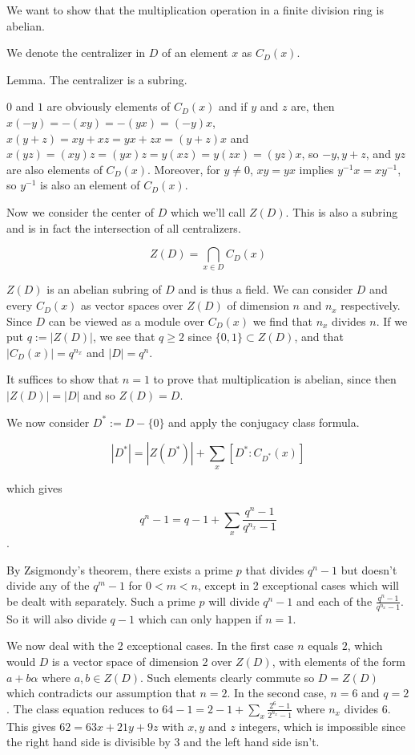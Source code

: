 \documentclass[12pt]{article}
\begin{document}
We want to show that the multiplication operation in a finite division
ring is abelian.

We denote the centralizer in $D$ of an element $x$ as $C_D(x)$. 

Lemma. The centralizer is a subring.

$0$ and $1$ are obviously elements of $C_D(x)$ and if $y$ and $z$ are,
then $x(-y) = -(xy) = -(yx) = (-y)x$, $x(y+z)=xy+xz=yx+zx=(y+z)x$ and
$x(yz)=(xy)z=(yx)z=y(xz)=y(zx)=(yz)x$, so $-y,y+z$, and $yz$ are also
elements of $C_D(x)$. Moreover, for $y\neq 0$, $xy=yx$ implies
$y^{-1}x=xy^{-1}$, so $y^{-1}$ is also an element of $C_D(x)$.

Now we consider the center of $D$ which we'll call $Z(D)$. This is
also a subring and is in fact the intersection of all centralizers.

$$ Z(D)=\bigcap_{x\in D}C_D(x) $$

$Z(D)$ is an abelian subring of $D$ and is thus a field. We can consider
$D$ and every $C_D(x)$ as vector spaces over $Z(D)$ of dimension $n$
and $n_x$ respectively. Since $D$ can be viewed as a module over
$C_D(x)$ we find that $n_x$ divides $n$. If we put $q:=|Z(D)|$, we see
that $q\geq 2$ since $\{0,1\}\subset Z(D)$, and that $|C_D(x)|=q^{n_x}$
and $|D|=q^n$.

It suffices to show that $n=1$ to prove that multiplication is
abelian, since then $|Z(D)|=|D|$ and so $Z(D)=D$.

We now consider $D^*:=D-\{0\}$ and apply the conjugacy class formula.

$$ |D^*| = |Z(D^*)| + \sum_{x} [D^*:C_{D^*}(x)] $$ 

which gives

$$ q^n-1 = q-1 + \sum_{x} \frac{q^n-1}{q^{n_x}-1}$$.

By Zsigmondy's theorem, there exists a prime $p$ that divides $q^n-1$
but doesn't divide any of the $q^m-1$ for $0<m<n$, except in 2
exceptional cases which will be dealt with separately. Such a prime
$p$ will divide $q^n-1$ and each of the $\frac{q^n-1}{q^{n_x}-1}$. So
it will also divide $q-1$ which can only happen if $n=1$.

We now deal with the 2 exceptional cases. In the first case $n$ equals
$2$, which would  $D$ is a vector space of dimension 2 over
$Z(D)$, with elements of the form $a+b\alpha$ where $a,b\in
Z(D)$. Such elements clearly commute so $D=Z(D)$ which contradicts
our assumption that $n=2$. In the second case, $n=6$ and $q=2$. The
class equation reduces to $64-1=2-1+\sum_{x} \frac{2^6-1}{2^{n_x}-1}$
where $n_x$ divides 6. This gives $62=63x+21y+9z$ with $x,y$ and $z$
integers, which is impossible since the right hand side is divisible
by 3 and the left hand side isn't.
\end{document}

